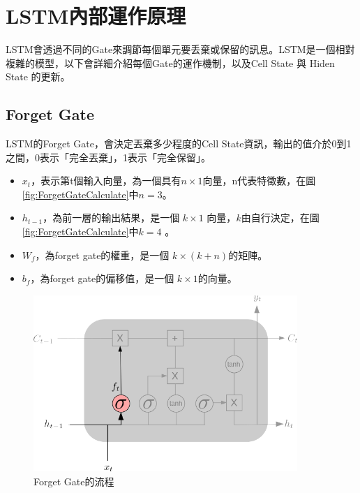 \newpage

\section{LSTM內部運作原理}

LSTM會透過不同的Gate來調節每個單元要丢棄或保留的訊息。LSTM是一個相對複雜的模型，以下會詳細介紹每個Gate的運作機制，以及Cell State 與 Hiden State 的更新。



\subsection{Forget Gate}

LSTM的Forget Gate，會決定丟棄多少程度的Cell State資訊，輸出的值介於0到1之間，0表示「完全丟棄」，1表示「完全保留」。

\begin{itemize}
	\item 
		\(x_t\)，表示第t個輸入向量，為一個具有\(n\times 1\)向量，n代表特徵數，在圖 \ref{fig:ForgetGateCalculate}中\(n = 3\)。

	\item 
		\(h_{t-1}\)，為前一層的輸出結果，是一個 \(k \times 1\) 向量，\(k\)由自行決定，在圖 \ref{fig:ForgetGateCalculate}中\(k = 4\) 。

	\item 
		\(W_f\)，為forget gate的權重，是一個 \(k \times (k+n)\)的矩陣。

	\item 
		\(b_f\)，為forget gate的偏移值，是一個 \(k \times 1\)的向量。
\end{itemize}



\begin{figure}[H]
	\centering
	\includegraphics[width=10cm]{./pic/DR88VjoI.png}
	\caption{Forget Gate的流程}
	\label{fig:ForgetGate}
\end{figure}

